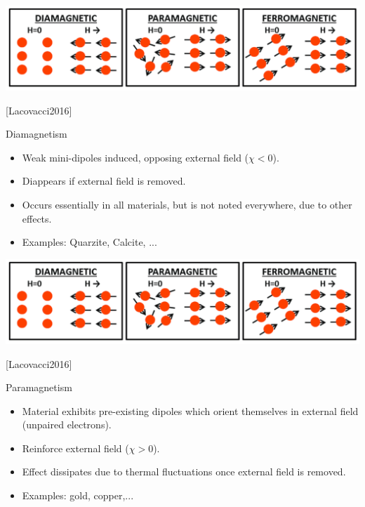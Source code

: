 \begin{frame}
  \begin{center}
    \includegraphics[width=0.7\linewidth]{Figures/Magnetics/ParaDiaFerro_Lacovacci2016.png}
  
    \tiny[Lacovacci2016]

    \vspace{0.24cm}
    
    \normalsize Diamagnetism
    \small 
    \begin{itemize}
      \item \alert{Weak} mini-dipoles induced, opposing external field ($\chi < 0$).
      \item Diappears if external field is removed.
      \item Occurs essentially in all materials, but is not noted everywhere, due to other effects. 
      \item Examples: Quarzite, Calcite, ...
    \end{itemize}
    
  \end{center}
\end{frame}

\begin{frame}
  \begin{center}
    \includegraphics[width=0.7\linewidth]{Figures/Magnetics/ParaDiaFerro_Lacovacci2016.png}
  
    \tiny[Lacovacci2016]

    \vspace{0.24cm}
    
    \normalsize Paramagnetism
    \small 
    \begin{itemize}
      \item Material exhibits \alert{pre-existing} dipoles which orient themselves in external field (unpaired electrons).
      \item \alert{Reinforce} external field ($\chi > 0$). 
      \item Effect dissipates due to thermal fluctuations once external field is removed.
      \item Examples: gold, copper,...
    \end{itemize}
    
  \end{center}
\end{frame}

